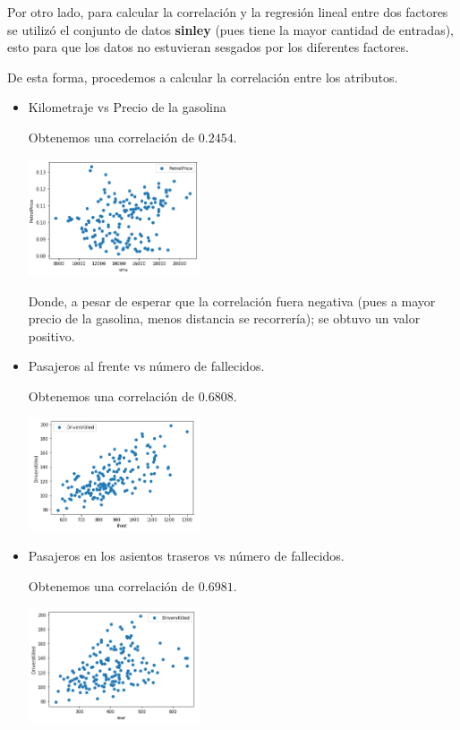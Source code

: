 \documentclass[letterpaper,11pt]{article}
\begin{document}
\begin{enumerate}
    Por otro lado, para calcular la correlación y la regresión lineal entre dos 
    factores se utilizó el conjunto de datos \textbf{sinley} (pues tiene la 
    mayor cantidad de entradas), esto para que los datos no estuvieran sesgados 
    por los diferentes factores.

    De esta forma, procedemos a calcular la correlación entre los atributos. 
    \begin{itemize}
        \item Kilometraje vs Precio de la gasolina
        
        Obtenemos una correlación de $0.2454$.
        \begin{center}
            \includegraphics[width=0.4\textwidth]{imagenes/seat3.png}
        \end{center}

        Donde, a pesar de esperar que la correlación fuera negativa (pues a 
        mayor precio de la gasolina, menos distancia se recorrería); se obtuvo 
        un valor positivo.

        \newpage
        \item Pasajeros al frente vs número de fallecidos.

        Obtenemos una correlación de $0.6808$.
        \begin{center}
            \includegraphics[width=0.4\textwidth]{imagenes/seat4.png}
        \end{center}

        \item Pasajeros en los asientos traseros vs número de fallecidos.

        Obtenemos una correlación de $0.6981$.
        \begin{center}
            \includegraphics[width=0.4\textwidth]{imagenes/seat5.png}
        \end{center}


\end{itemize}
\end{enumerate}
\end{document}
